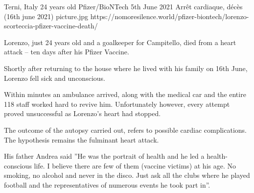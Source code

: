           {Terni, Italy}
          {24 years old}
          {Pfizer/BioNTech}
          {5th June 2021}
          {
            Arrêt cardiaque,
            décès (16th june 2021)
          }
          {picture.jpg}
          {https://nomoresilence.world/pfizer-biontech/lorenzo-scorteccia-pfizer-vaccine-death/}
          {

Lorenzo, just 24 years old and a goalkeeper for Campitello, died from a heart
attack – ten days after his Pfizer Vaccine.

Shortly after returning to the house where he lived with his family on 16th
June, Lorenzo fell sick and unconscious.

Within minutes an ambulance arrived, along with the medical car and the entire
118 staff worked hard to revive him. Unfortunately however, every attempt proved
unsuccessful as Lorenzo’s heart had stopped.

The outcome of the autopsy carried out, refers to possible cardiac
complications. The hypothesis remains the fulminant heart attack.

His father Andrea said ”He was the portrait of health and he led a
health-conscious life. I believe there are few of them (vaccine victims) at his
age. No smoking, no alcohol and never in the disco. Just ask all the clubs where
he played football and the representatives of numerous events he took part in”.

}
